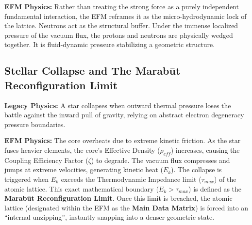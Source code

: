 \documentclass[11pt, a4paper]{article}
\begin{document}
  \textbf{EFM Physics:} Rather than treating the strong force as a purely independent fundamental interaction, the EFM reframes it as the micro-hydrodynamic lock of the lattice. Neutrons act as the structural buffer. Under the immense localized pressure of the vacuum flux, the protons and neutrons are physically wedged together. It is fluid-dynamic pressure stabilizing a geometric structure.

  \subsection{Stellar Collapse and The Marab\={u}t Reconfiguration Limit}
  \textbf{Legacy Physics:} A star collapses when outward thermal pressure loses the battle against the inward pull of gravity, relying on abstract electron degeneracy pressure boundaries.

  \textbf{EFM Physics:} The core overheats due to extreme kinetic friction. As the star fuses heavier elements, the core's Effective Density ($\rho_{eff}$) increases, causing the Coupling Efficiency Factor ($\zeta$) to degrade. The vacuum flux compresses and jumps at extreme velocities, generating kinetic heat ($E_k$). The collapse is triggered when $E_k$ exceeds the Thermodynamic Impedance limit ($\tau_{max}$) of the atomic lattice. This exact mathematical boundary ($E_k > \tau_{max}$) is defined as the \textbf{Marab\={u}t Reconfiguration Limit}. Once this limit is breached, the atomic lattice (designated within the EFM as the \textbf{Main Data Matrix}) is forced into an ``internal unzipping'', instantly snapping into a denser geometric state.

\end{document}
